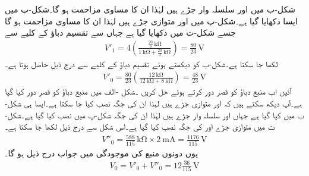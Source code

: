 شکل-ب میں  اور  سلسلہ وار جڑے ہیں لہٰذا ان کا مساوی مزاحمت  ہو گا۔شکل-پ میں ایسا دکھایا گیا ہے۔شکل-پ میں  اور  متوازی جڑے ہیں لہٰذا ان کا مساوی مزاحمت
  ہو گا جسے شکل-ت میں دکھایا گیا ہے جہاں سے تقسیم دباؤ کے کلیے سے
\begin{align*}
V'_1=4\left(\frac{\frac{20}{3} \, \si{\kilo\ohm}}{\SI{1}{\kilo\ohm}+\frac{20}{3} \, \si{\kilo\ohm}}\right) =\frac{80}{23}\,\si{\volt}
\end{align*}
لکھا جا سکتا ہے۔شکل-ب کو دیکھتے ہوئے تقسیم دباؤ کے کلیے سے درج ذیل حاصل ہوتا ہے۔
\begin{align*}
V'_0=\frac{80}{23}\left(\frac{\SI{12}{\kilo\ohm}}{\SI{12}{\kilo\ohm}+\SI{8}{\kilo\ohm}}\right)=\frac{48}{23}\, \si{\volt}
\end{align*}
آئیں اب منبع دباؤ کو قصر دور کرتے ہوئے حل کریں ۔شکل -الف  میں منبع دباؤ کو قصر دور کیا گیا ہے۔آپ دیکھ سکتے ہیں کہ  اور  متوازی جڑے ہیں لہٰذا ان کی جگہ  نصب کیا جا سکتا ہے۔ایسا ہی شکل-ب میں کیا گیا ہے جہاں  اور  سلسلہ وار جڑے ہیں لہٰذا ان کی جگہ شکل-پ میں  نصب کیا گیا ہے۔شکل-ت میں متوازی جڑے  اور  کی جگہ  نصب کیا گیا ہے۔اس شکل سے درج ذیل لکھا جا سکتا ہے۔
\begin{align*}
V''_0=\frac{588}{115} \, \si{\kilo\ohm} \times \SI{2}{\milli\ampere}=\frac{1176}{115}\, \si{\volt}
\end{align*}
یوں دونوں منبع کی موجودگی میں جواب درج ذیل ہو گا۔
\begin{align*}
V_0=V'_0+V''_0=12\frac{36}{115}\,\si{\volt}
\end{align*}

